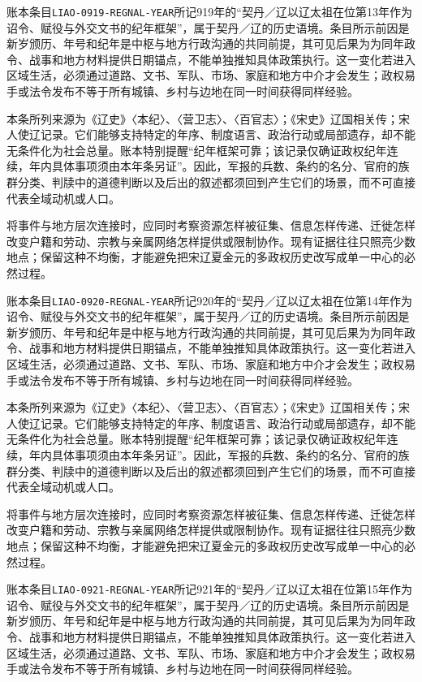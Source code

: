 账本条目\texttt{LIAO-0919-REGNAL-YEAR}所记919年的“契丹／辽以辽太祖在位第13年作为诏令、赋役与外交文书的纪年框架”，属于契丹／辽的历史语境。条目所示前因是新岁颁历、年号和纪年是中枢与地方行政沟通的共同前提，其可见后果为为同年政令、战事和地方材料提供日期锚点，不能单独推知具体政策执行。这一变化若进入区域生活，必须通过道路、文书、军队、市场、家庭和地方中介才会发生；政权易手或法令发布不等于所有城镇、乡村与边地在同一时间获得同样经验。

本条所列来源为《辽史》〈本纪〉、〈营卫志〉、〈百官志〉；《宋史》辽国相关传；宋人使辽记录。它们能够支持特定的年序、制度语言、政治行动或局部遗存，却不能无条件化为社会总量。账本特别提醒“纪年框架可靠；该记录仅确证政权纪年连续，年内具体事项须由本年条另证”。因此，军报的兵数、条约的名分、官府的族群分类、判牍中的道德判断以及后出的叙述都须回到产生它们的场景，而不可直接代表全域动机或人口。

将事件与地方层次连接时，应同时考察资源怎样被征集、信息怎样传递、迁徙怎样改变户籍和劳动、宗教与亲属网络怎样提供或限制协作。现有证据往往只照亮少数地点；保留这种不均衡，才能避免把宋辽夏金元的多政权历史改写成单一中心的必然过程。

账本条目\texttt{LIAO-0920-REGNAL-YEAR}所记920年的“契丹／辽以辽太祖在位第14年作为诏令、赋役与外交文书的纪年框架”，属于契丹／辽的历史语境。条目所示前因是新岁颁历、年号和纪年是中枢与地方行政沟通的共同前提，其可见后果为为同年政令、战事和地方材料提供日期锚点，不能单独推知具体政策执行。这一变化若进入区域生活，必须通过道路、文书、军队、市场、家庭和地方中介才会发生；政权易手或法令发布不等于所有城镇、乡村与边地在同一时间获得同样经验。

本条所列来源为《辽史》〈本纪〉、〈营卫志〉、〈百官志〉；《宋史》辽国相关传；宋人使辽记录。它们能够支持特定的年序、制度语言、政治行动或局部遗存，却不能无条件化为社会总量。账本特别提醒“纪年框架可靠；该记录仅确证政权纪年连续，年内具体事项须由本年条另证”。因此，军报的兵数、条约的名分、官府的族群分类、判牍中的道德判断以及后出的叙述都须回到产生它们的场景，而不可直接代表全域动机或人口。

将事件与地方层次连接时，应同时考察资源怎样被征集、信息怎样传递、迁徙怎样改变户籍和劳动、宗教与亲属网络怎样提供或限制协作。现有证据往往只照亮少数地点；保留这种不均衡，才能避免把宋辽夏金元的多政权历史改写成单一中心的必然过程。

账本条目\texttt{LIAO-0921-REGNAL-YEAR}所记921年的“契丹／辽以辽太祖在位第15年作为诏令、赋役与外交文书的纪年框架”，属于契丹／辽的历史语境。条目所示前因是新岁颁历、年号和纪年是中枢与地方行政沟通的共同前提，其可见后果为为同年政令、战事和地方材料提供日期锚点，不能单独推知具体政策执行。这一变化若进入区域生活，必须通过道路、文书、军队、市场、家庭和地方中介才会发生；政权易手或法令发布不等于所有城镇、乡村与边地在同一时间获得同样经验。

